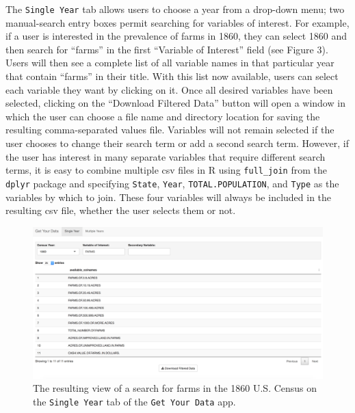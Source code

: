 \documentclass[11pt,]{article}
\begin{document}
The \texttt{Single\ Year} tab allows users to choose a year from a
drop-down menu; two manual-search entry boxes permit searching for
variables of interest. For example, if a user is interested in the
prevalence of farms in 1860, they can select 1860 and then search for
``farms'' in the first ``Variable of Interest'' field (see Figure 3).
Users will then see a complete list of all variable names in that
particular year that contain ``farms'' in their title. With this list
now available, users can select each variable they want by clicking on
it. Once all desired variables have been selected, clicking on the
``Download Filtered Data'' button will open a window in which the user
can choose a file name and directory location for saving the resulting
comma-separated values file. Variables will not remain selected if the
user chooses to change their search term or add a second search term.
However, if the user has interest in many separate variables that
require different search terms, it is easy to combine multiple csv files
in R using \texttt{full\_join} from the \texttt{dplyr} package and
specifying \texttt{State}, \texttt{Year}, \texttt{TOTAL.POPULATION}, and
\texttt{Type} as the variables by which to join. These four variables
will always be included in the resulting csv file, whether the user
selects them or not.

\begin{figure}[htbp]
\centering
\includegraphics{./figures/app-sshot-farms.png}
\caption{The resulting view of a search for farms in the 1860 U.S.
Census on the \texttt{Single\ Year} tab of the \texttt{Get\ Your\ Data}
app.}
\end{figure}
\end{document}
